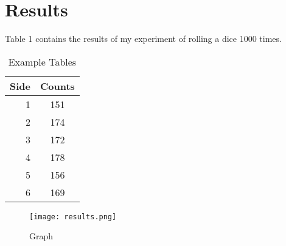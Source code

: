\documentclass{article}
\begin{document}
\section*{Results}

Table 1 contains the results of my experiment of rolling a dice 1000 times.

\begin{table}[h!]
    \centering
    \begin{tabular}{r||c}
    Side	& Counts\\
    \hline
    1	& 151\\
    2	& 174\\
    3	& 172\\
    4	& 178\\
    5	& 156\\
    6	& 169\\
    \end{tabular}
    \caption{Example Tables}
    \label{tbl:example}
\end{table}

\begin{figure}[h!]
\centering
\texttt{[image: results.png]}
\caption{Graph}
\label{fig:graph}
\end{figure}
\end{document}
